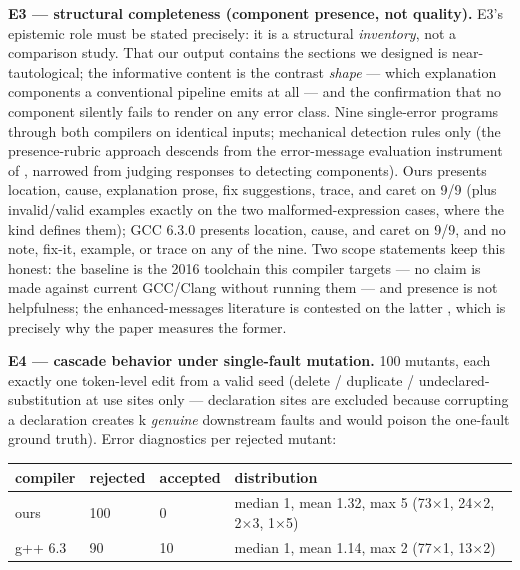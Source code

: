 \textbf{E3 --- structural completeness (component presence, not quality).}
E3's epistemic role must be stated precisely: it is a structural
\emph{inventory}, not a comparison study. That our output contains the
sections we designed is near-tautological; the informative content
is the contrast \emph{shape} --- which explanation components a
conventional pipeline emits at all --- and the confirmation that no
component silently fails to render on any error class. Nine
single-error programs through both compilers on identical inputs;
mechanical detection rules only (the presence-rubric approach
descends from the error-message evaluation instrument of \cite{marceau2011measuring},
narrowed from judging responses to detecting components). Ours presents location,
cause, explanation prose, fix suggestions, trace, and caret on 9/9
(plus invalid/valid examples exactly on the two malformed-expression
cases, where the kind defines them); GCC 6.3.0 presents location,
cause, and caret on 9/9, and no note, fix-it, example, or trace on
any of the nine. Two scope statements keep this honest: the baseline
is the 2016 toolchain this compiler targets --- no claim is made
against current GCC/Clang without running them --- and presence is not
helpfulness; the enhanced-messages literature is contested on the
latter \cite{denny2014enhancing,pettit2017enhanced}, which is precisely why the paper measures the former.

\textbf{E4 --- cascade behavior under single-fault mutation.} 100 mutants,
each exactly one token-level edit from a valid seed (delete /
duplicate / undeclared-substitution at use sites only --- declaration
sites are excluded because corrupting a declaration creates k
\emph{genuine} downstream faults and would poison the one-fault ground
truth). Error diagnostics per rejected mutant:

\begin{table}[t]
\centering
\small
\begin{tabular}{llll}
\toprule
compiler & rejected & accepted & distribution \\
\midrule
ours & 100 & 0 & median 1, mean 1.32, max 5 (73$\times$1, 24$\times$2, 2$\times$3, 1$\times$5) \\
g++ 6.3 & 90 & 10 & median 1, mean 1.14, max 2 (77$\times$1, 13$\times$2) \\
\bottomrule
\end{tabular}
\end{table}

